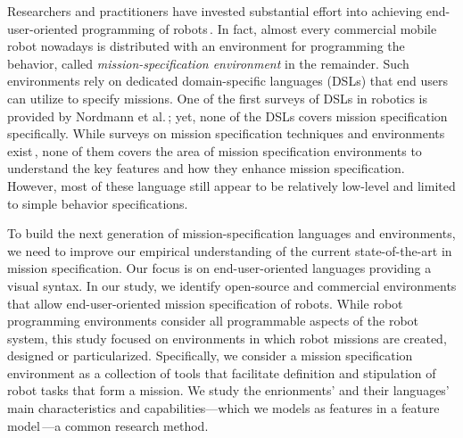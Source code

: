 

Researchers and practitioners have invested substantial effort into achieving end-user-oriented programming of robots\,\cite{Weintrop2018,Biggs2003,Bozhinoski2016b,Arts2010,Nordmann2016a}. In fact, almost every commercial mobile robot nowadays is distributed with an environment for programming the behavior, called \emph{mission-specification environment} in the remainder. Such environments rely on dedicated domain-specific languages (DSLs) that end users can utilize to specify missions.
One of the first surveys of DSLs in robotics is provided by Nordmann et al.\,\cite{Nordmann2014,Nordmann2016a}; yet, none of the DSLs covers mission specification specifically. While surveys on mission specification techniques and environments exist\,\cite{Biggs2003,Bravo2018,Luckcuck2018},
none of them covers the area of mission specification environments to understand the key features and how they enhance mission specification. However, most of these language still appear to be relatively low-level and limited to simple behavior specifications.

To build the next generation of mission-specification languages and environments, we need to improve our empirical understanding of the current state-of-the-art in mission specification. Our focus is on end-user-oriented languages providing a visual syntax. In our study, we identify open-source and commercial environments that allow end-user-oriented mission specification of robots. While robot programming environments consider all programmable aspects of the robot system, this study focused on environments in which robot missions are created, designed or particularized. Specifically, we consider a mission specification environment as a collection of tools that facilitate definition and stipulation of robot tasks that form a mission. We study the enrionments' and their languages' main characteristics and capabilities---which we models as features in a feature model\,\cite{kang.ea:1990:foda,damir2019principles}---a common research method. %

